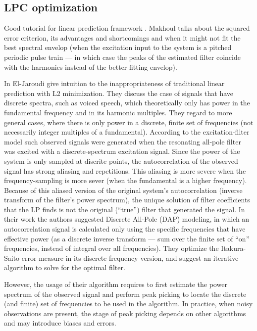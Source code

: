 \documentclass[journal]{IEEEtran}
\begin{document}
\subsection{LPC optimization}
Good tutorial for linear prediction framework \cite{makhoul1975linearPredictionTutorial}. Makhoul talks about the squared error criterion, its advantages and shortcomings and when it might not fit the best spectral envelop (when the excitation input to the system is a pitched periodic pulse train --- in which case the peaks of the estimated filter coincide with the harmonics instead of the better fitting envelop).

In \cite{el1991discrete} El-Jaroudi \etal give intuition to the inappropriateness of traditional linear prediction with L2 minimization. They discuss the case of signals that have discrete spectra, such as voiced speech, which theoretically only has power in the fundamental frequency and in its harmonic multiples. They regard to more general cases, where there is only power in a discrete, finite set of frequencies (not necessarily integer multiples of a fundamental). According to the excitation-filter model such observed signals were generated when the resonating all-pole filter was excited with a discrete-spectrum excitation signal. Since the power of the system is only sampled at discrite points, the autocorrelation of the observed signal has strong aliasing and repetitions. This aliasing is more severe when the frequency-sampling is more sever (when the fundamental is a higher frequency). Because of this aliased version of the original system's autocorrelation (inverse transform of the filter's power spectrum), the unique solution of filter coefficients that the LP finds is not the original (``true'') filter that generated the signal. In their work the authors suggested Discrete All-Pole (DAP) modeling, in which an autocorrelation signal is calculated only using the specific frequencies that have effective power (as a discrete inverse transform --- sum over the finite set of ``on'' frequencies, instead of integral over all frequencies). They optimize the Itakura-Saito error measure in its discrete-frequency version, and suggest an iterative algorithm to solve for the optimal filter.

However, the usage of their algorithm requires to first estimate the power spectrum of the observed signal and perform peak picking to locate the discrete (and finite) set of frequencies to be used in the algorithm. In practice, when noisy observations are present, the stage of peak picking depends on other algorithms and may introduce biases and errors.
\end{document}
